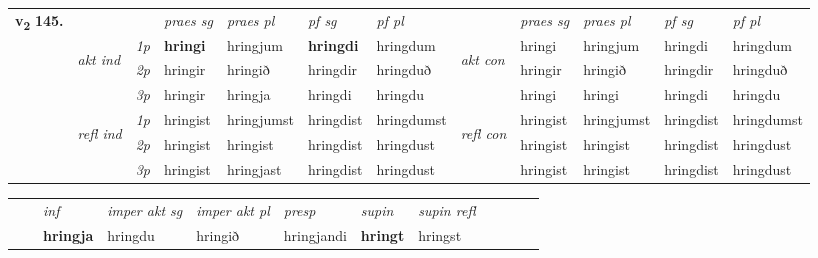 \begin{tabular}{llllllllllll} \toprule
\multirow{4}{*}{{{\textbf{v{\textsubscript{2}}} \Large{\textbf{145.}}}}}  & &   &  \textit{praes sg}  & \textit{praes pl}  &\textit{ pf sg} & \textit{pf pl} &  &  \textit{praes sg}  & \textit{praes pl}  & \textit{pf sg} & \textit{pf pl } \\*
	\cmidrule{4-7} \cmidrule{9-12}
 & \multirow{3}{*}{\begin{turn}{90}\textit{akt ind}\end{turn}} & {\textit{1p}} & \textbf{hringi} & hringjum    & \textbf{hringdi} & hringdum & \multirow{3}{*}{\begin{turn}{90}\textit{akt con}\end{turn}} &hringi & hringjum & hringdi & hringdum\\*
& &  {\textit{2p}} &  hringir  & hringið   & hringdir & hringduð & & hringir & hringið & hringdir & hringduð \\*
& &  {\textit{3p}} & hringir & hringja   & hringdi & hringdu & & hringi & hringi& hringdi & hringdu  \\*
\cmidrule{4-7} \cmidrule{9-12}
 &\multirow{3}{*}{\begin{turn}{90}\textit{refl ind}\end{turn}} & {\textit{1p}} & hringist & hringjumst    & hringdist & hringdumst & \multirow{3}{*}{\begin{turn}{90}\textit{refl con}\end{turn}}  &hringist & hringjumst & hringdist & hringdumst\\*
 &&  {\textit{2p}} &  hringist  & hringist   & hringdist & hringdust & &hringist & hringist & hringdist & hringdust \\*
& &  {\textit{3p}} & hringist & hringjast   & hringdist & hringdust & & hringist & hringist& hringdist & hringdust  \\*
\cmidrule{4-7} \cmidrule{9-12}
\end{tabular}


\begin{tabular}{llllllllllll}
 & & \textit{inf} & \textit{imper akt sg} & \textit{imper akt pl}   & \textit{presp} & \textit{supin} & \textit{supin refl}      \\*
  & & \textbf{hringja} & hringdu  & hringið   & hringjandi &  \textbf{hringt} & hringst  \\*
\cmidrule{1-12}
\end{tabular}



